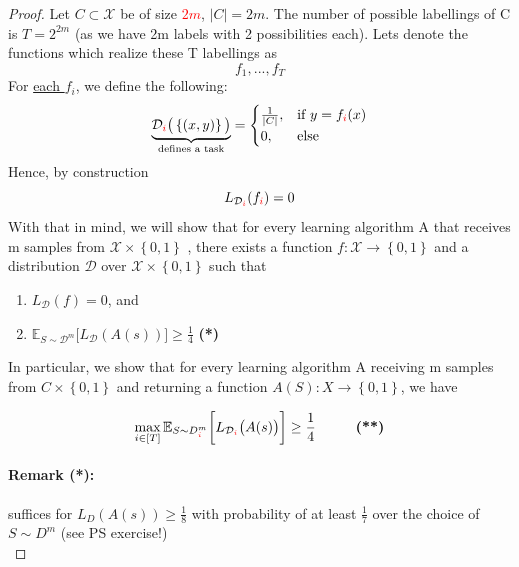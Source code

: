 \documentclass[10pt,a4paper]{article}
\theoremstyle{definition}
\theoremstyle{plain}
\begin{document}
\begin{proof}
	Let $C \subset \mathcal{X}$ be of size \textcolor{red}{$2m$}, $|C| = 2m$. The number of possible labellings of C is  $T = 2^{2m}$ (as we have 2m labels with 2 possibilities each). Lets denote the functions which realize these T labellings as 
	$$ f_1 , ..., f_T $$
	For \underline{each $f_i$}, we define the following:
	\begin{align*}
		\underbrace{\mathcal{D}_{\textcolor{red}{i}}\big(\left\{(x,y)\right\}\big)}_{\text{defines a task}} = \begin{cases}
				\frac{1}{|C|} , &  \text{if $y = f_{\textcolor{red}{i}}(x)$}\\
				0 , &   \text{else} 
		\end{cases}
	\end{align*}
	Hence, by construction 
	$$
		L_{\mathcal{D}_{\textcolor{red}{i}}}(f_{\textcolor{red}{i}}) = 0
	$$
	With that in mind, we will show that for every learning algorithm A that receives m samples from $\mathcal{X} \times \left\{0,1\right\}$ , there exists a function $f: \mathcal{X} \to \left\{0,1\right\}$ and a distribution $\mathcal{D}$ over $\mathcal{X} \times \left\{0,1\right\}$ such that

		\begin{enumerate}

			\item $L_\mathcal{D}(f) = 0$, and
			\item $\mathbb{E}_{S \sim \mathcal{D}^m}\big[L_\mathcal{D}(A(s))\big] \geq \frac{1}{4}$ \hspace{1cm} \textbf{(*)}
		\end{enumerate}	
	In particular, we show that for every learning algorithm A receiving m samples from $C \times \left\{0,1\right\}$ and returning a function $A(S): X \to \left\{0,1\right\}$, we have
	
	$$
		\max_{i \in [T]} \mathbb{E}_{S \sim D^{m}_{\textcolor{red}{i}}}\bigg[L_{\mathcal{D}_{\textcolor{red}{i}}}\big(A(s)\big)\bigg] \geq \frac{1}{4} \hspace{1cm} \text{\textbf{(**)}}
	$$
	\paragraph{Remark (*):} suffices for $L_D(A(s)) \geq \frac{1}{8}$ with probability of at least $\frac{1}{7}$ over the choice of $S \sim D^m$ (see PS exercise!)\\
	

\end{proof}
\end{document}
